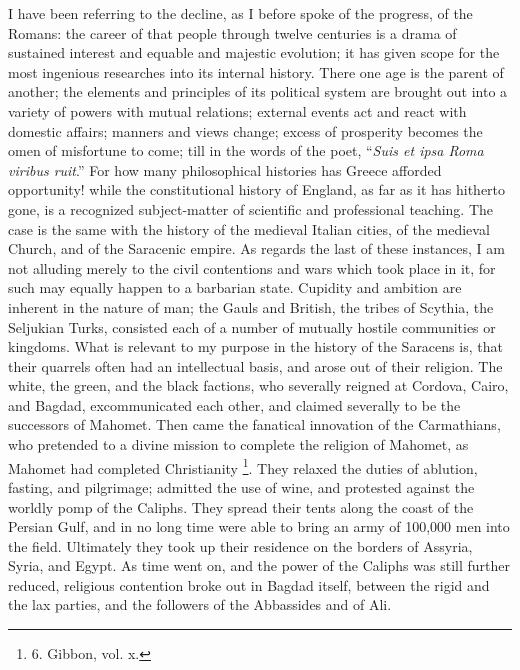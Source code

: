 I have been referring to the
decline, as I before spoke of the progress, of the Romans: the career
of that people through twelve centuries is a drama of sustained
interest and equable and majestic evolution; it has given scope
for the most ingenious researches into its internal history. There one
age is the parent of another; the elements and principles of its
political system are brought out into a variety of powers with mutual
relations; external events act and react with domestic affairs;
manners and views change; excess of prosperity becomes the omen of
misfortune to come; till in the words of the poet, ``\emph{Suis et ipsa
Roma viribus ruit}.'' For how many philosophical histories has
Greece afforded opportunity! while the constitutional history of
England, as far as it has hitherto gone, is a recognized
subject-matter of scientific and professional teaching. The case is
the same with the history of the medieval Italian cities, of the
medieval Church, and of the Saracenic empire. As regards the last of
these instances, I am not alluding merely to the civil contentions and
wars which took place in it, for such may equally happen to a
barbarian state. Cupidity and ambition are inherent in the nature of
man; the Gauls and British, the tribes of Scythia, the Seljukian
Turks, consisted each of a number of mutually hostile communities or
kingdoms. What is relevant to my purpose in the history of the
Saracens is, that their quarrels often had an intellectual basis, and
arose out of their religion. The white, the green, and the black
factions, who severally reigned at Cordova, Cairo, and Bagdad,
excommunicated each other, and claimed severally to be the successors
of Mahomet. Then came the fanatical innovation of the Carmathians, who
pretended to a divine mission to complete the religion of Mahomet, as
Mahomet had completed Christianity \footnote{6.
Gibbon, vol. x.}. They relaxed the duties of ablution, fasting, and pilgrimage;
admitted the use of wine, and protested against the worldly pomp of the Caliphs. They spread their tents along the coast of the Persian
Gulf, and in no long time were able to bring an army of 100,000 men
into the field. Ultimately they took up their residence on the borders
of Assyria, Syria, and Egypt. As time went on, and the power of the
Caliphs was still further reduced, religious contention broke out in
Bagdad itself, between the rigid and the lax parties, and the
followers of the Abbassides and of Ali.

